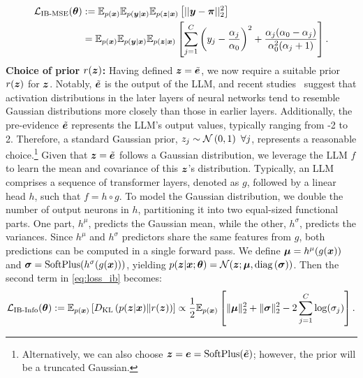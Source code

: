 \begin{equation}
    \begin{aligned}
        \mathcal{L}_{\text{IB-MSE}}(\bm{\theta}) &:= \mathbb{E}_{p(\bm{x})}\mathbb{E}_{p(\bm{y} | \bm{x})} \mathbb{E}_{p(\bm{z} | \bm{x})}\left[ ||\bm{y} -\bm{\pi}||_2^2 \right] \\
        &=\mathbb{E}_{p(\bm{x})} \mathbb{E}_{p(\bm{y} | \bm{x})} \mathbb{E}_{p(\bm{z} | \bm{x})}\left[\sum_{j=1}^C \left(y_j - \frac{\alpha_j}{\alpha_0}\right)^2 + \frac{\alpha_j (\alpha_0 - \alpha_j)}{\alpha_0^2 (\alpha_j + 1)} \right].
    \end{aligned}
    \label{eq:loss_ib_mse}
\end{equation}
\textbf{Choice of prior $r(\bm{z})$:} Having defined $\bm{z} = \tilde{\bm{e}}$, we now require a suitable prior $r(\bm{z})$ for $\bm{z}$. Notably, $\tilde{\bm{e}}$ is the output of the LLM, and recent studies~\citep{zhang2021fine,hashemi2021gaussian} suggest that activation distributions in the later layers of neural networks tend to resemble Gaussian distributions more closely than those in earlier layers. Additionally, the pre-evidence $\tilde{\bm{e}}$ represents the LLM's output values, typically ranging from -2 to 2. Therefore, a standard Gaussian prior, $z_j \sim \mathcal{N}\left( 0, 1 \right) \ \forall j$, represents a reasonable choice.\footnote{Alternatively, we can also choose $\bm{z} = \bm{e} = \text{SoftPlus}(\tilde{\bm{e}})$; however, the prior will be a truncated Gaussian.} Given that $\bm{z} = \tilde{\bm{e}}$ follows a Gaussian distribution, we leverage the LLM $f$ to learn the mean and covariance of this $\bm{z}$'s distribution. Typically, an LLM comprises a sequence of transformer layers, denoted as $g$, followed by a linear head $h$, such that $f = h \circ g$. To model the Gaussian distribution, we double the number of output neurons in $h$, partitioning it into two equal-sized functional parts. One part, $h^{\mu}$, predicts the Gaussian mean, while the other, $h^{\sigma}$, predicts the variances. Since $h^\mu$ and $h^\sigma$ predictors share the same features from $g$, both predictions can be computed in a single forward pass. We define $\bm{\mu} = h^{\mu}(g(\bm{x}))$ and $\bm{\sigma} = \text{SoftPlus}(h^{\sigma}(g(\bm{x})))$, yielding $p(\bm{z} | \bm{x}; \bm{\theta}) = \mathcal{N}(\bm{z} ; \bm{\mu}, \text{diag}\left( \bm{\sigma} \right))$. Then the second term in \cref{eq:loss_ib} becomes: 
\begin{equation}
    \begin{aligned}
        \mathcal{L}_{\text{IB-Info}}(\bm{\theta}) := \mathbb{E}_{p(\bm{x})} \left[D_{\text{KL}}\left(p(\bm{z} | \bm{x}) \| r(\bm{z}) \right)\right] \propto \frac{1}{2} \mathbb{E}_{p(\bm{x})}\left[\| \bm{\mu} \|_2^2 + \| \bm{\sigma} \|_2^2 - 2 \sum_{j=1}^C \log(\sigma_j) \right].
    \end{aligned}
    \label{eq:loss_ib_info}
\end{equation}
